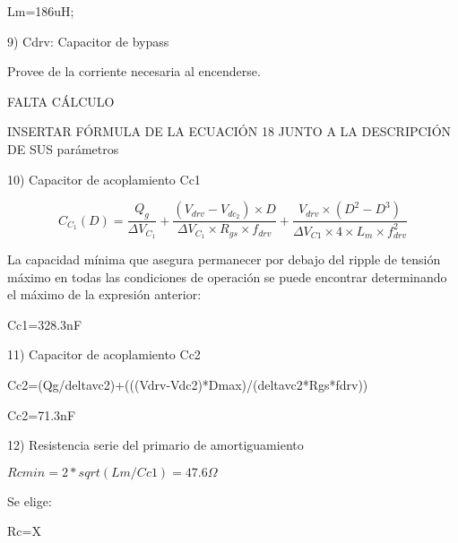 Lm=186uH;

9) Cdrv: Capacitor de bypass

Provee de la corriente necesaria al encenderse. 

FALTA CÁLCULO

INSERTAR FÓRMULA DE LA ECUACIÓN 18 JUNTO A LA DESCRIPCIÓN DE SUS parámetros

10) Capacitor de acoplamiento Cc1

$$ C_{C_1}(D)=\frac{Q_g}{\Delta V_{C_1}}+\frac{(V_{drv}-V_{{dc}_2})\times D}{\Delta V_{C_1}\times R_{gs}\times f_{drv}}+\frac{V_{drv}\times (D^2-D^3)}{\Delta V_{C1}\times 4\times L_m\times f_{drv}^2} $$

La capacidad mínima que asegura permanecer por debajo del ripple de tensión máximo en todas las condiciones de operación 
se puede encontrar determinando el máximo de la expresión anterior:

Cc1=328.3nF

11) Capacitor de acoplamiento Cc2

Cc2=(Qg/deltavc2)+(((Vdrv-Vdc2)*Dmax)/(deltavc2*Rgs*fdrv))

Cc2=71.3nF

12) Resistencia serie del primario de amortiguamiento

$Rcmin=2*sqrt(Lm/Cc1)=47.6\Omega$

Se elige:

Rc=X